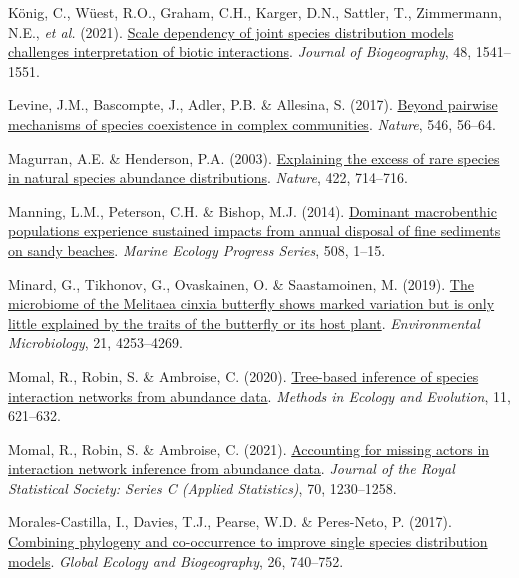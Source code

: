 \documentclass[9pt,biorxiv,doublespacing,lineno]{lapreprint}
\newlength{\cslhangindent}
\newlength{\cslentryspacingunit} %
\newenvironment{CSLReferences}[2] %
 {%
  \setlength{\parindent}{0pt}
  \ifodd #1
  \let\oldpar\par
  \def\par{\hangindent=\cslhangindent\oldpar}
  \fi
  \setlength{\parskip}{#2\cslentryspacingunit}
 }%
 {}
\begin{document}
\begin{CSLReferences}{1}{0}
\leavevmode{}%
König, C., Wüest, R.O., Graham, C.H., Karger, D.N., Sattler, T.,
Zimmermann, N.E., \emph{et al.} (2021).
\href{https://doi.org/10.1111/jbi.14106}{Scale dependency of joint
species distribution models challenges interpretation of biotic
interactions}. \emph{Journal of Biogeography}, 48, 1541--1551.

\leavevmode{}%
Levine, J.M., Bascompte, J., Adler, P.B. \& Allesina, S. (2017).
\href{https://doi.org/10.1038/nature22898}{Beyond pairwise mechanisms of
species coexistence in complex communities}. \emph{Nature}, 546, 56--64.

\leavevmode{}%
Magurran, A.E. \& Henderson, P.A. (2003).
\href{https://doi.org/10.1038/nature01547}{Explaining the excess of rare
species in natural species abundance distributions}. \emph{Nature}, 422,
714--716.

\leavevmode{}%
Manning, L.M., Peterson, C.H. \& Bishop, M.J. (2014).
\href{https://www.int-res.com/abstracts/meps/v508/p1-15/}{Dominant
macrobenthic populations experience sustained impacts from annual
disposal of fine sediments on sandy beaches}. \emph{Marine Ecology
Progress Series}, 508, 1--15.

\leavevmode{}%
Minard, G., Tikhonov, G., Ovaskainen, O. \& Saastamoinen, M. (2019).
\href{https://doi.org/10.1111/1462-2920.14786}{The microbiome of the
Melitaea cinxia butterfly shows marked variation but is only little
explained by the traits of the butterfly or its host plant}.
\emph{Environmental Microbiology}, 21, 4253--4269.

\leavevmode{}%
Momal, R., Robin, S. \& Ambroise, C. (2020).
\href{https://doi.org/10.1111/2041-210X.13380}{Tree-based inference of
species interaction networks from abundance data}. \emph{Methods in
Ecology and Evolution}, 11, 621--632.

\leavevmode{}%
Momal, R., Robin, S. \& Ambroise, C. (2021).
\href{https://doi.org/10.1111/rssc.12509}{Accounting for missing actors
in interaction network inference from abundance data}. \emph{Journal of
the Royal Statistical Society: Series C (Applied Statistics)}, 70,
1230--1258.

\leavevmode{}%
Morales-Castilla, I., Davies, T.J., Pearse, W.D. \& Peres-Neto, P.
(2017). \href{https://doi.org/10.1111/geb.12580}{Combining phylogeny and
co-occurrence to improve single species distribution models}.
\emph{Global Ecology and Biogeography}, 26, 740--752.


\end{CSLReferences}
\end{document}
